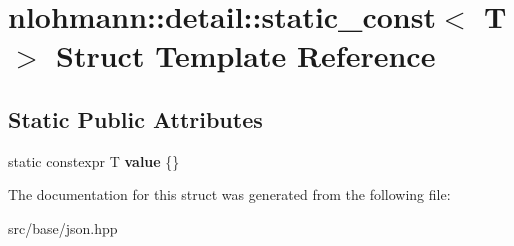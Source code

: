 \hypertarget{structnlohmann_1_1detail_1_1static__const}{}\section{nlohmann\+:\+:detail\+:\+:static\+\_\+const$<$ T $>$ Struct Template Reference}
\label{structnlohmann_1_1detail_1_1static__const}
\subsection*{Static Public Attributes}
\begin{DoxyCompactItemize}
\item 
\mbox{\label{structnlohmann_1_1detail_1_1static__const_a6bb7ab2ddd6abc41fb4ffb7c6dfa237e}} 
static constexpr T {\bfseries value} \{\}
\end{DoxyCompactItemize}


The documentation for this struct was generated from the following file\+:\begin{DoxyCompactItemize}
\item 
src/base/json.\+hpp\end{DoxyCompactItemize}
